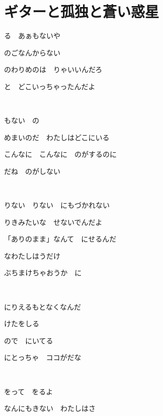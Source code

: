 \section{ギターと孤独と蒼い惑星}

る　あぁもないや

のごなんからない

のわりめのは　りゃいいんだろ

と　どこいっちゃったんだよ

~

もない　の

めまいのだ　わたしはどこにいる

こんなに　こんなに　のがするのに

だね　のがしない

~

りない　りない　にもづかれない

りきみたいな　せないでんだよ

「ありのまま」なんて　にせるんだ

なわたしはうだけ

ぶちまけちゃおうか　に

~

にりえるもとなくなんだ

けたをしる

\;ので　にいてる

にとっちゃ　ココがだな

~

をって　をるよ

なんにもきない　わたしはさ

